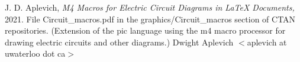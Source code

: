 J. D. Aplevich,
{\it M4 Macros for Electric Circuit Diagrams in LaTeX Documents,}
2021.
File Circuit\_macros.pdf in the graphics/Circuit\_macros section
of CTAN repositories.
(Extension of the pic
language using the m4 macro processor for drawing electric circuits
and other diagrams.)
%
    Dwight Aplevich $<$aplevich at uwaterloo dot ca$>$
%
%

